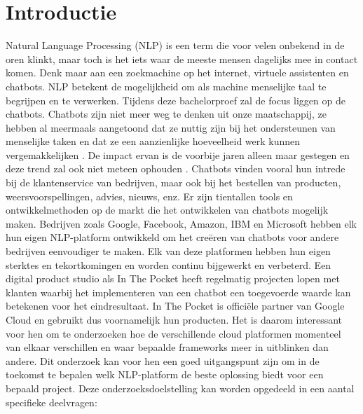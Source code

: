 
\section{Introductie} %
\label{sec:introductie}
Natural Language Processing (NLP) is een term die voor velen onbekend in de oren klinkt, maar toch is het iets waar de meeste mensen dagelijks mee in contact komen. Denk maar aan een zoekmachine op het internet, virtuele assistenten en chatbots. NLP betekent de mogelijkheid om als machine menselijke taal te begrijpen en te verwerken. Tijdens deze bachelorproef zal de focus liggen op de chatbots. Chatbots zijn niet meer weg te denken uit onze maatschappij, ze hebben al meermaals aangetoond dat ze nuttig zijn bij het ondersteunen van menselijke taken en dat ze een aanzienlijke hoeveelheid werk kunnen vergemakkelijken \autocite{Atwell2007}.  De impact ervan is de voorbije jaren alleen maar gestegen en deze trend zal ook niet meteen ophouden \autocite{BRAIN2019}. Chatbots vinden vooral hun intrede bij de klantenservice van bedrijven, maar ook bij het bestellen van producten, weersvoorspellingen, advies, nieuws, enz. Er zijn tientallen tools en ontwikkelmethoden op de markt die het ontwikkelen van chatbots mogelijk maken. Bedrijven zoals Google, Facebook, Amazon, IBM en Microsoft hebben elk hun eigen NLP-platform ontwikkeld om het creëren van chatbots voor andere bedrijven eenvoudiger te maken. Elk van deze platformen hebben hun eigen sterktes en tekortkomingen en worden continu bijgewerkt en verbeterd. Een digital product studio als In The Pocket heeft regelmatig projecten lopen met klanten waarbij het implementeren van een chatbot een toegevoerde waarde kan betekenen voor het eindresultaat. In The Pocket is officiële partner van Google Cloud en gebruikt dus voornamelijk hun producten. Het is daarom interessant voor hen om te onderzoeken hoe de verschillende cloud platformen momenteel van elkaar verschillen en waar bepaalde frameworks meer in uitblinken dan andere. Dit onderzoek kan voor hen een goed uitgangspunt zijn om in de toekomst te bepalen welk NLP-platform de beste oplossing biedt voor een bepaald project. Deze onderzoeksdoelstelling kan worden opgedeeld in een aantal specifieke deelvragen:

